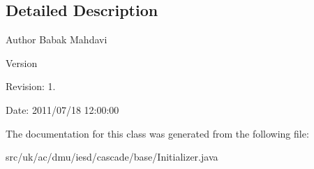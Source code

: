 \subsection{Detailed Description}
\begin{DoxyAuthor}{Author}
Babak Mahdavi 
\end{DoxyAuthor}
\begin{DoxyVersion}{Version}

\end{DoxyVersion}
\begin{DoxyParagraph}{Revision\-:}
1. 
\end{DoxyParagraph}
\begin{DoxyParagraph}{Date\-:}
2011/07/18 12\-:00\-:00 
\end{DoxyParagraph}


The documentation for this class was generated from the following file\-:\begin{DoxyCompactItemize}
\item 
src/uk/ac/dmu/iesd/cascade/base/Initializer.\-java\end{DoxyCompactItemize}
